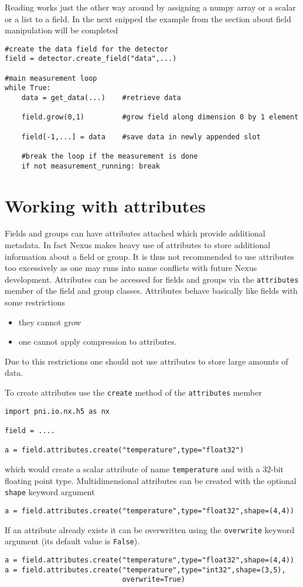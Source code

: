 Reading works just the other way around by assigning a numpy array or a scalar
or a list to a field. In the next snipped the example from the section about
field manipulation will be completed 
\begin{verbatim}
#create the data field for the detector
field = detector.create_field("data",...)

#main measurement loop
while True:
    data = get_data(...)    #retrieve data

    field.grow(0,1)         #grow field along dimension 0 by 1 element
   
    field[-1,...] = data    #save data in newly appended slot
   
    #break the loop if the measurement is done
    if not measurement_running: break

\end{verbatim}

\section{Working with attributes}

Fields and groups can have attributes attached which provide additional
metadata. In fact Nexus makes heavy use of attributes to store additional 
information about a field or group. It is thus not recommended to use 
attributes too excessively as one may runs into name conflicts with future Nexus
development. 
Attributes can be accessed for fields  and groups via the {\tt attributes}
member of the field and group classes. Attributes behave basically like fields
with some restrictions
\begin{itemize}
    \item they cannot grow
    \item one cannot apply compression to attributes.
\end{itemize}
Due to this restrictions one should not use attributes to store large amounts of
data. 

To create attributes use the {\tt create} method of the {\tt attributes} member
\begin{verbatim}
import pni.io.nx.h5 as nx

field = ....

a = field.attributes.create("temperature",type="float32")
\end{verbatim}
which would create a scalar attribute of name {\tt temperature} and with a
32-bit floating point type. Multidimensional attributes can be created with the
optional {\tt shape} keyword argument
\begin{verbatim}
a = field.attributes.create("temperature",type="float32",shape=(4,4))
\end{verbatim}
If an attribute already exists it can be overwritten using the {\tt overwrite}
keyword argument (its default value is {\tt False}). 
\begin{verbatim}
a = field.attributes.create("temperature",type="float32",shape=(4,4))
a = field.attributes.create("temperature",type="int32",shape=(3,5),
                            overwrite=True)
\end{verbatim}

